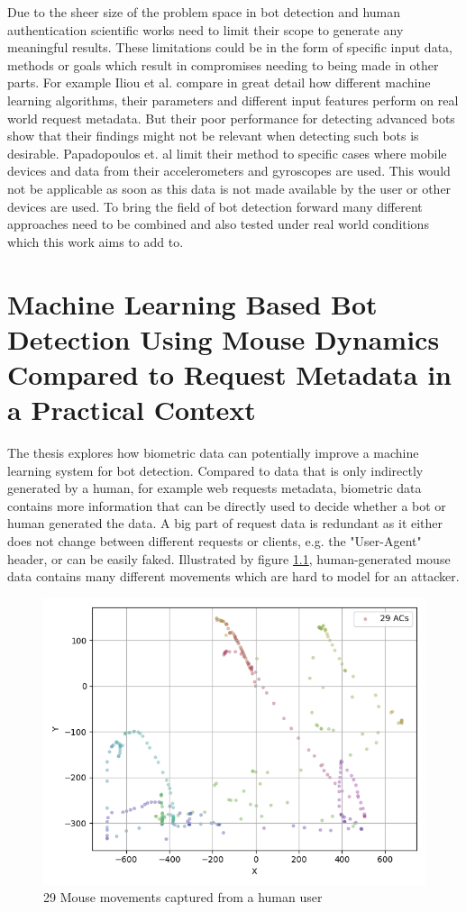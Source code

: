 \documentclass[
    fontsize=12pt,
    headings=small,
    parskip=half,           %
    bibliography=totoc,
    numbers=noenddot,       %
    open=any,               %
    final,                   %
    table
]{scrreprt}
\begin{document}
Due to the sheer size of the problem space in bot detection and human authentication scientific works need to limit their scope to generate any meaningful results. These limitations could be in the form of specific input data, methods or goals which result in compromises needing to being made in other parts. For example Iliou et al. \cite{10.1145/3339252.3339267} compare in great detail how different machine learning algorithms, their parameters and different input features perform on real world request metadata. But their poor performance for detecting advanced bots show that their findings might not be relevant when detecting such bots is desirable. Papadopoulos et. al \cite{PETS2021} limit their method to specific cases where mobile devices and data from their accelerometers and gyroscopes are used. This would not be applicable as soon as this data is not made available by the user or other devices are used. To bring the field of bot detection forward many different approaches need to be combined and also tested under real world conditions which this work aims to add to.


\chapter{Machine Learning Based Bot Detection Using Mouse Dynamics Compared to Request Metadata in a Practical Context}

The thesis explores how biometric data can potentially improve a machine learning system for bot detection. Compared to data that is only indirectly generated by a human, for example web requests metadata, biometric data contains more information that can be directly used to decide whether a bot or human generated the data. A big part of request data is redundant as it either does not change between different requests or clients, e.g. the "User-Agent" header, or can be easily faked. Illustrated by figure \ref{fig:user_mouse_heatmap}, human-generated mouse data contains many different movements which are hard to model for an attacker.

\begin{figure}[h]
    \includegraphics[width=\textwidth]{figures/user_mouse_heatmap.png}
    \caption{29 Mouse movements captured from a human user}
    \label{fig:user_mouse_heatmap}
\end{figure}
\end{document}
